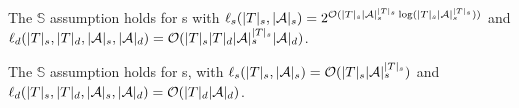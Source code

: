 \begin{lemma}\label{lem-spt}
The $\mathbb{S}$\prerec{} assumption holds for \SSPT{}s with $\ell_s(|T|_s, |\mathcal{A}|_s) = 2^{\mathcal{O}( |T|_s |\mathcal{A}|_s^{|T|_s} \log (|T|_s |\mathcal{A}|_s^{|T|_s}))}$ and  $\ell_d(|T|_s, |T|_d, |\mathcal{A}|_s, |\mathcal{A}|_d) = \mathcal{O}(|T|_s  |T|_d |\mathcal{A}|_s^{|T|_s} |\mathcal{A}|_d)$. 

The $\mathbb{S}$\prerec{} assumption holds for \SPT{}s, with $\ell_s(|T|_s, |\mathcal{A}|_s) =\mathcal{O}(|T|_s |\mathcal{A}|_s^{|T|_s})$ and  $\ell_d(|T|_s, |T|_d, |\mathcal{A}|_s, |\mathcal{A}|_d) = \mathcal{O}(|T|_d |\mathcal{A}|_d)$.
%
\end{lemma}


